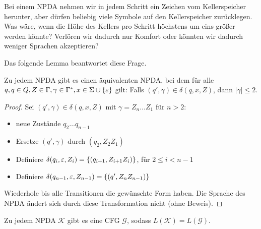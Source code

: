 Bei einem \ac{NPDA} nehmen wir in jedem Schritt ein Zeichen vom Kellerspeicher herunter,
aber dürfen beliebig viele Symbole auf den Kellerspeicher zurücklegen.
Was wäre, wenn die Höhe des Kellers pro Schritt höchstens um eins größer werden könnte?
Verlören wir dadurch nur Komfort oder könnten wir dadurch weniger Sprachen akzeptieren?

Das folgende Lemma beantwortet diese Frage.
\begin{lemma}\label{lem:4.limitStackIncrease}
        Zu jedem \ac{NPDA} gibt es einen äquivalenten \ac{NPDA}, bei dem
        für alle $q,q\in Q, Z\in\Gamma, \gamma\in\Gamma^*, x\in\Sigma\cup\{\varepsilon\}$
        gilt: Falls $(q',\gamma)\in\delta(q,x,Z)$, dann $|\gamma| \le 2$.
\end{lemma}
\begin{proof}
        Sei $(q',\gamma)\in\delta(q,x,Z)$ mit $\gamma = Z_n\dots Z_1$ für $n>2$:
        \begin{itemize}
        \item   neue Zustände $q_2\dots q_{n-1}$
        \item Ersetze $(q',\gamma)$ durch $(q_2, Z_2Z_1)$
        \item Definiere $\delta(q_i, \varepsilon, Z_i) = \{ (q_{i+1}, Z_{i+1}Z_i) \}$, für $2\le i < n-1$
        \item Definiere $\delta(q_{n-1}, \varepsilon, Z_{n-1}) = \{ (q', Z_nZ_{n-1}) \}$
        \end{itemize}
        Wiederhole bis alle Transitionen die gewünschte Form haben.
        Die Sprache des \ac{NPDA} ändert sich durch diese Transformation nicht (ohne Beweis).\qedhere
\end{proof}


\begin{lemma}\label{lem:4.npdaToCfg}
 Zu jedem \ac{NPDA} $\mathcal{K}$ gibt es eine \ac{CFG} $\mathcal{G}$, sodass $L(\mathcal{K})=L(\mathcal{G})$.
\end{lemma}


